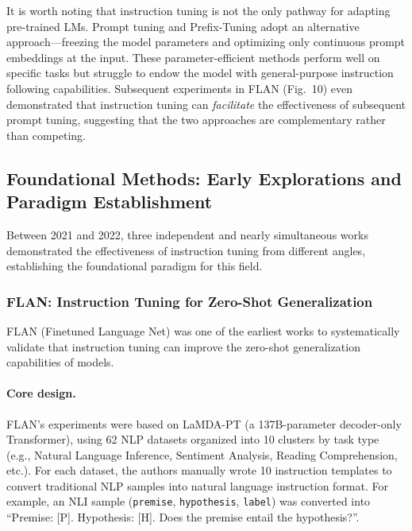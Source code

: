 It is worth noting that instruction tuning is not the only pathway for adapting pre-trained LMs.
Prompt tuning \citep{lester2021prompt} and Prefix-Tuning \citep{li2021prefix}
adopt an alternative approach---freezing the model parameters and optimizing only continuous prompt embeddings at the input.
These parameter-efficient methods perform well on specific tasks
but struggle to endow the model with general-purpose instruction following capabilities.
Subsequent experiments in FLAN (Fig.~10) even demonstrated that instruction tuning can \emph{facilitate}
the effectiveness of subsequent prompt tuning, suggesting that the two approaches are complementary rather than competing.

\subsection{Foundational Methods: Early Explorations and Paradigm Establishment}
\label{sec:t1-foundation}

Between 2021 and 2022, three independent and nearly simultaneous works demonstrated
the effectiveness of instruction tuning from different angles, establishing the foundational paradigm for this field.


\subsubsection{FLAN: Instruction Tuning for Zero-Shot Generalization}
\label{sec:t1-flan}

FLAN (Finetuned Language Net) was one of the earliest works to systematically validate
that instruction tuning can improve the zero-shot generalization capabilities of models.

\paragraph{Core design.}
FLAN's experiments were based on LaMDA-PT (a 137B-parameter decoder-only Transformer),
using 62 NLP datasets organized into 10 clusters by task type
(e.g., Natural Language Inference, Sentiment Analysis, Reading Comprehension, etc.).
For each dataset, the authors manually wrote 10 instruction templates to convert traditional NLP samples into
natural language instruction format.
For example, an NLI sample (\texttt{premise}, \texttt{hypothesis}, \texttt{label})
was converted into ``Premise: [P]. Hypothesis: [H]. Does the premise entail the hypothesis?''.

